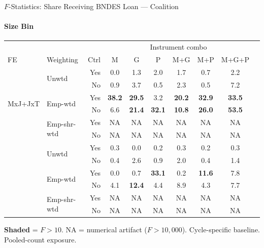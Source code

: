 \documentclass[aspectratio=169,10pt]{beamer}
\newcommand{\fpass}[1]{\cellcolor{pass}\textbf{#1}}
\begin{document}
\begin{frame}[t]{$F$-Statistics: Share Receiving BNDES Loan --- Coalition}
\framesubtitle{Size Bin}
\begin{center}
\footnotesize
\setlength{\tabcolsep}{3.5pt}
\renewcommand{\arraystretch}{1.05}
\begin{tabular}{@{}llrccccccc@{}}
\toprule
 & & & \multicolumn{6}{c}{Instrument combo} \\
\cmidrule(l{2pt}r{2pt}){4-9}
FE & Weighting & Ctrl & M & G & P & M+G & M+P & M+G+P \\
\midrule
  \multirow{6}{*}{MxJ+JxT} & \multirow{2}{*}{Unwtd} & Yes & 0.0 & 1.3 & 2.0 & 1.7 & 0.7 & 2.2 \\
   &  & No & 0.9 & 3.7 & 0.5 & 2.3 & 0.5 & 7.2 \\
   & \multirow{2}{*}{Emp-wtd} & Yes & \fpass{38.2} & \fpass{29.5} & 3.2 & \fpass{20.2} & \fpass{32.9} & \fpass{33.5} \\
   &  & No & 6.6 & \fpass{21.4} & \fpass{32.1} & \fpass{10.8} & \fpass{26.0} & \fpass{53.5} \\
   & \multirow{2}{*}{Emp-shr-wtd} & Yes & NA & NA & NA & NA & NA & NA \\
   &  & No & NA & NA & NA & NA & NA & NA \\
\addlinespace[5pt]
  \multirow{6}{*}{MxJ+MxT} & \multirow{2}{*}{Unwtd} & Yes & 0.3 & 0.0 & 0.2 & 0.3 & 0.2 & 0.3 \\
   &  & No & 0.4 & 2.6 & 0.9 & 2.0 & 0.4 & 1.4 \\
   & \multirow{2}{*}{Emp-wtd} & Yes & 0.0 & 0.7 & \fpass{33.1} & 0.2 & \fpass{11.6} & 7.8 \\
   &  & No & 4.1 & \fpass{12.4} & 4.4 & 8.9 & 4.3 & 7.7 \\
   & \multirow{2}{*}{Emp-shr-wtd} & Yes & NA & NA & NA & NA & NA & NA \\
   &  & No & NA & NA & NA & NA & NA & NA \\
\bottomrule
\end{tabular}
\end{center}
{\scriptsize \colorbox{pass}{\textbf{Shaded}} = $F>10$. NA = numerical artifact ($F>10{,}000$). Cycle-specific baseline. Pooled-count exposure.}
\end{frame}
\end{document}
